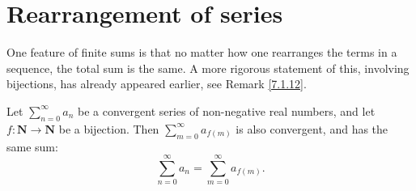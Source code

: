 \section{Rearrangement of series}\label{sec 7.4}

\begin{note}
    One feature of finite sums is that no matter how one rearranges the terms in a sequence, the total sum is the same.
    A more rigorous statement of this, involving bijections, has already appeared earlier, see Remark \ref{7.1.12}.
\end{note}

\begin{proposition}\label{7.4.1}
    Let \(\sum_{n = 0}^\infty a_n\) be a convergent series of non-negative real numbers, and let \(f : \mathbf{N} \to \mathbf{N}\) be a bijection.
    Then \(\sum_{m = 0}^\infty a_{f(m)}\) is also convergent, and has the same sum:
    \[
        \sum_{n = 0}^\infty a_n = \sum_{m = 0}^\infty a_{f(m)}.
    \]
\end{proposition}


